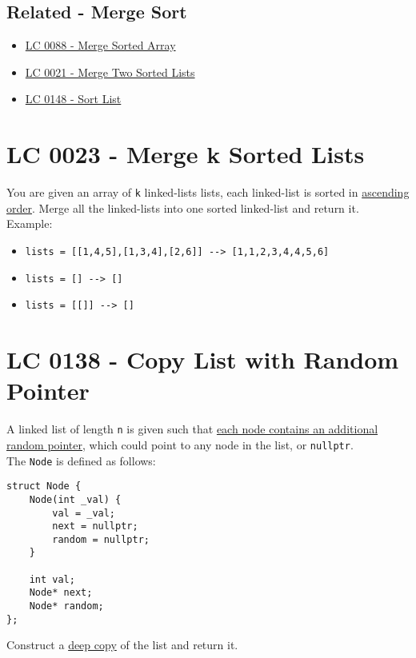 \subsection*{Related - Merge Sort}
\begin{itemize}
\item \hyperref[lc0088]{LC 0088 - Merge Sorted Array}
\item \hyperref[lc0021]{LC 0021 - Merge Two Sorted Lists}
\item \hyperref[lc0148]{LC 0148 - Sort List}
\end{itemize}


\section{LC 0023 - Merge k Sorted Lists}\label{lc0023}
You are given an array of {\colorbox{CodeBackground}{\lstinline|k|}} linked-lists lists, each linked-list is sorted in \ul{ascending order}. Merge all the linked-lists into one sorted linked-list and return it.\\

Example:
\begin{itemize}
	\item {\colorbox{CodeBackground}{\lstinline|lists = [[1,4,5],[1,3,4],[2,6]] --> [1,1,2,3,4,4,5,6]|}}
	\item {\colorbox{CodeBackground}{\lstinline|lists = [] --> []|}}
	\item {\colorbox{CodeBackground}{\lstinline|lists = [[]] --> []|}}
\end{itemize}

\section{LC 0138 - Copy List with Random Pointer}\label{lc0138}
A linked list of length {\colorbox{CodeBackground}{\lstinline|n|}} is given such that \ul{each node contains an additional random pointer}, which could point to any node in the list, or {\colorbox{CodeBackground}{\lstinline|nullptr|}}. \\

The {\colorbox{CodeBackground}{\lstinline|Node|}} is defined as follows:
\begin{lstlisting}
struct Node {
	Node(int _val) {
		val = _val;
		next = nullptr;
		random = nullptr;
	}
	
	int val;
	Node* next;
	Node* random;
};
\end{lstlisting}

Construct a \ul{deep copy} of the list and return it.

